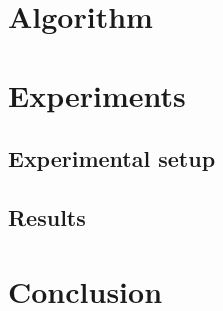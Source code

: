 \documentclass{ecai2010}
\begin{document}
\section{Algorithm}

\section{Experiments}
\subsection{Experimental setup}

\subsection{Results}

\section{Conclusion}


\end{document}

